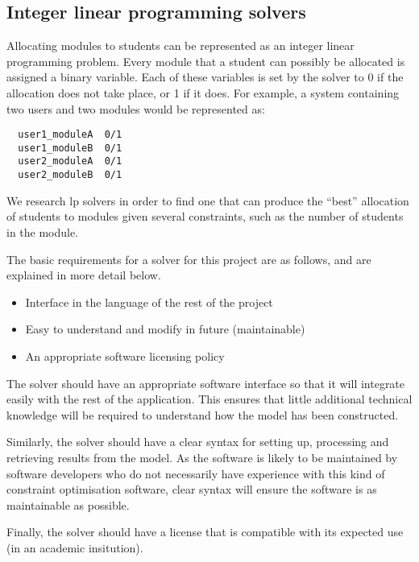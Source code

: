 
\subsection{Integer linear programming solvers}


Allocating modules to students can be represented as an integer linear
programming problem. Every module that a student can possibly be allocated is
assigned a binary variable. Each of these variables is set by the solver to 0
if the allocation does not take place, or 1 if it does. For example, a system
containing two users and two modules would be represented as:

\begin{verbatim}
  user1_moduleA  0/1
  user1_moduleB  0/1
  user2_moduleA  0/1
  user2_moduleB  0/1
\end{verbatim}

We research \gls{lp} solvers in order to find one that can produce the
``best'' allocation of students to modules given several constraints, such as
the number of students in the module.

The basic requirements for a solver for this project are as follows, and are
explained in more detail below.

\begin{itemize}
  \item Interface in the language of the rest of the project
  \item Easy to understand and modify in future (maintainable)
  \item An appropriate software licensing policy
\end{itemize}

The solver should have an appropriate software interface so that it will
integrate easily with the rest of the application. This ensures that little
additional technical knowledge will be required to understand how the model
has been constructed.

Similarly, the solver should have a clear syntax for setting up, processing
and retrieving results from the model. As the software is likely to be
maintained by software developers who do not necessarily have experience with
this kind of constraint optimisation software, clear syntax will ensure the
software is as maintainable as possible.

Finally, the solver should have a license that is compatible with its expected
use (in an academic insitution).

% 
% 
% 
% 
% 
